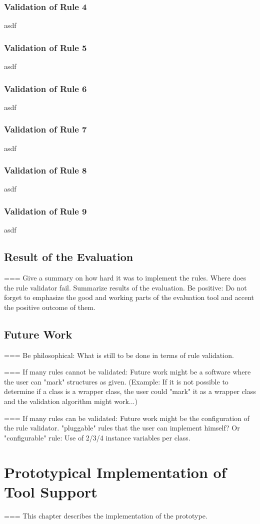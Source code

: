 \subsection{Validation of Rule 4}
asdf
\subsection{Validation of Rule 5}
asdf
\subsection{Validation of Rule 6}
asdf
\subsection{Validation of Rule 7}
asdf
\subsection{Validation of Rule 8}
asdf
\subsection{Validation of Rule 9}
asdf
\section{Result of the Evaluation}
\label{e:result}
=== Give a summary on how hard it was to implement the rules. Where does the rule validator fail. Summarize results of the evaluation. 
Be positive: Do not forget to emphasize the good and working parts of the evaluation tool and accent the positive outcome of them.
\section{Future Work}
\label{e:future}
=== Be philosophical: What is still to be done in terms of rule validation. 

=== If many rules cannot be validated: Future work might be a software where the user can "mark" structures as given. (Example: If it is not possible to determine if a class is a wrapper class, the user could "mark" it as a wrapper class and the validation algorithm might work...)

=== If many rules can be validated: Future work might be the configuration of the rule validator. "pluggable" rules that the user can implement himself? Or "configurable" rule: Use of 2/3/4 instance variables per class. 

\chapter{Prototypical Implementation of Tool Support}
\label{Prototype}
=== This chapter describes the implementation of the prototype. 
